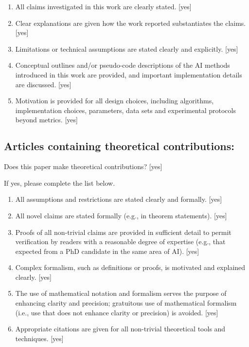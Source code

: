 \documentclass[manuscript, screen, review]{jair}
\begin{document}
\begin{enumerate}
    \item All claims investigated in this work are clearly stated. 
    [yes]
    \item Clear explanations are given how the work reported substantiates the claims. 
    [yes]
    \item Limitations or technical assumptions are stated clearly and explicitly. 
    [yes]
    \item Conceptual outlines and/or pseudo-code descriptions of the AI methods introduced in this work are provided, and important implementation details are discussed. 
    [yes]
    \item Motivation is provided for all design choices, including algorithms, implementation choices, parameters, data sets and experimental protocols beyond metrics.
    [yes]
\end{enumerate}

\subsection*{Articles containing theoretical contributions:}
Does this paper make theoretical contributions? 
[yes] 

If yes, please complete the list below.

\begin{enumerate}
    \item All assumptions and restrictions are stated clearly and formally. 
    [yes]
    \item All novel claims are stated formally (e.g., in theorem statements). 
    [yes]
    \item Proofs of all non-trivial claims are provided in sufficient detail to permit verification by readers with a reasonable degree of expertise (e.g., that expected from a PhD candidate in the same area of AI). [yes]
    \item Complex formalism, such as definitions or proofs, is motivated and explained clearly.
    [yes]
    \item The use of mathematical notation and formalism serves the purpose of enhancing clarity and precision; gratuitous use of mathematical formalism (i.e., use that does not enhance clarity or precision) is avoided.
    [yes]
    \item Appropriate citations are given for all non-trivial theoretical tools and techniques. 
    [yes]
\end{enumerate}
\end{document}
